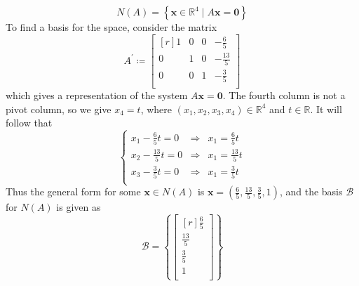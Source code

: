 \documentclass{article}
\theoremstyle{definition}
\newenvironment{solution}[1][]{\begin{replacementsoln}}{\end{replacementsoln}}
\begin{document}
\begin{solution}
  \[
    N(A) = \left\{ \mathbf{x}\in\mathbb{R}^4 \mid A \mathbf{x}=\mathbf{0} \right\} 
  \]
  To find a basis for the space, consider the matrix
  \[
    A^{\prime} \coloneqq \begin{bmatrix}[r]
      1 &0  & 0 &-\frac{6}{5}   \\[5pt]
       0&1  &0  &-\frac{13}{5}   \\[5pt]
       0&0  &1  &-\frac{3}{5}   \\
    \end{bmatrix}
  \]
  which gives a representation of the system \(A \mathbf{x}=\mathbf{0}\). The fourth column is not a pivot column, so we give \(x_4 = t\), where \((x_1,x_2,x_3,x_4)\in\mathbb{R}^4\) and \(t\in\mathbb{R}\). It will follow that
  \[
    \left\{
      \begin{array}{ccc}
        x_1 - \frac{6}{5}t = 0&\Longrightarrow &x_1 = \frac{6}{5}t\\[5pt]
        x_{2}  - \frac{13}{5}t = 0&\Longrightarrow &x_1 = \frac{13}{5}t\\[5pt]
        x_3 - \frac{3}{5}t = 0&\Longrightarrow &x_1 = \frac{3}{5}t\\[5pt]
      \end{array}
    \right.
  \]
Thus the general form for some \(\mathbf{x}\in N(A)\) is \(\mathbf{x}=\left(\frac{6}{5},\frac{13}{5},\frac{3}{5},1\right)\), and the basis \(\mathcal{B} \) for \(N(A)\) is given as 
\[
  \mathcal{B} =\left\{ \begin{bmatrix}[r]
     \frac{6}{5} \\[5pt]
      \frac{13}{5}\\[5pt]
      \frac{3}{5}\\[5pt]
      1\\
  \end{bmatrix} \right\} 
\]


\end{solution}
\end{document}
